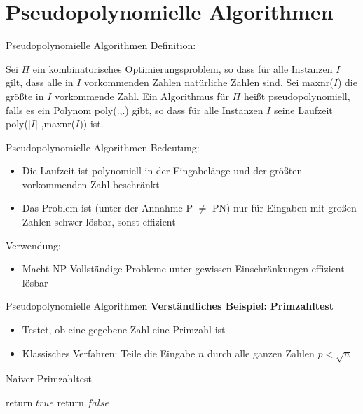\section{Pseudopolynomielle Algorithmen}

\begin{frame}{Pseudopolynomielle Algorithmen}
Definition:

Sei $\Pi$ ein kombinatorisches Optimierungsproblem, so dass für alle Instanzen $I$ gilt, dass alle in $I$ vorkommenden Zahlen natürliche Zahlen sind. Sei maxnr($I$) die größte in $I$ vorkommende Zahl. Ein Algorithmus für $\Pi$ heißt pseudopolynomiell, falls es ein Polynom poly(.,.)  gibt, so 
dass für alle Instanzen $I$ seine Laufzeit poly(|$I$| ,maxnr($I$)) ist. 

\end{frame}
\begin{frame}{Pseudopolynomielle Algorithmen}
Bedeutung:

\begin{itemize}
\item
Die Laufzeit ist polynomiell in der Eingabelänge und der größten vorkommenden Zahl beschränkt

\item
Das Problem ist (unter der Annahme P $\neq$ PN) nur für Eingaben mit großen Zahlen schwer lösbar, sonst effizient

\end{itemize}

Verwendung:
\begin{itemize}
\item
Macht NP-Vollständige Probleme unter gewissen Einschränkungen effizient lösbar

\end{itemize}
\end{frame}

\begin{frame}{Pseudopolynomielle Algorithmen}
\textbf{Verständliches Beispiel:}
\textbf{Primzahltest}

\begin{itemize}
\item
Testet, ob eine gegebene Zahl eine Primzahl ist
\item
Klassisches Verfahren: Teile die Eingabe $n$ durch alle ganzen Zahlen $p < \sqrt{n}$
\end{itemize}

\begin{algorithm}[H]
\caption{Naiver Primzahltest}
    \begin{algorithmic}
                  	\State return $true$
            \Else
                  	\State return $false$
            \EndIf
            \EndFor
        \EndFunction
    \end{algorithmic}
\end{algorithm}
\end{frame}

